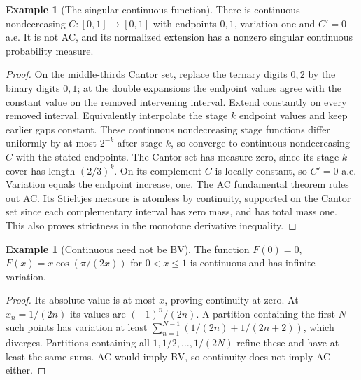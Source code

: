 \documentclass[11pt,oneside,openany]{book}
\theoremstyle{definition}
\newtheorem{example}[theorem]{Example}
\theoremstyle{remark}
\newcommand{\family}[1]{}
\begin{document}
\begin{example}[The singular continuous function]\family{D11.12.singular_continuous_counterexample}\label{d11:12:singular-continuous-counterexample}
There is continuous nondecreasing $C:[0,1]\to[0,1]$ with endpoints
$0,1$, variation one and $C'=0$ a.e. It is not AC, and its normalized
extension has a nonzero singular continuous probability measure.
\end{example}
\begin{proof}
On the middle-thirds Cantor set, replace the ternary digits $0,2$ by the
binary digits $0,1$; at the double expansions the endpoint values agree
with the constant value on the removed intervening interval. Extend
constantly on every removed interval. Equivalently interpolate the stage
$k$ endpoint values and keep earlier gaps constant. These continuous
nondecreasing stage functions differ uniformly by at most $2^{-k}$ after
stage $k$, so converge to continuous nondecreasing $C$ with the stated
endpoints. The Cantor set has measure zero, since its stage $k$ cover has
length $(2/3)^k$. On its complement $C$ is locally constant, so $C'=0$
a.e. Variation equals the endpoint increase, one. The AC fundamental
theorem rules out AC. Its Stieltjes measure is atomless by continuity,
supported on the Cantor set since each complementary interval has zero
mass, and has total mass one. This also proves strictness in the monotone
derivative inequality.
\end{proof}

\begin{example}[Continuous need not be BV]\family{D11.12.continuous_not_bv}\label{d11:12:continuous-not-bv}
The function $F(0)=0$, $F(x)=x\cos(\pi/(2x))$ for $0<x\leq1$ is
continuous and has infinite variation.
\end{example}
\begin{proof}
Its absolute value is at most $x$, proving continuity at zero. At
$x_n=1/(2n)$ its values are $(-1)^n/(2n)$. A partition containing the
first $N$ such points has variation at least
$\sum_{n=1}^{N-1}(1/(2n)+1/(2n+2))$, which diverges. Partitions
containing all $1,1/2,\ldots,1/(2N)$ refine these and have at least the
same sums. AC would imply BV, so continuity does not imply AC either.
\end{proof}
\end{document}
